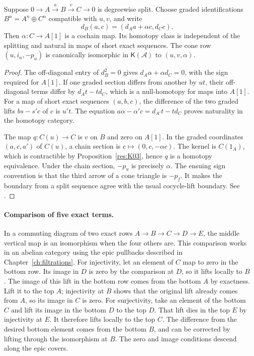 \begin{proposition}\label{res:K04}
Suppose \(0\to A\xrightarrow{u}B\xrightarrow{v}C\to0\) is degreewise
split. Choose graded identifications \(B^n=A^n\oplus C^n\) compatible
with \(u,v\), and write
\[
 d_B(a,c)=(d_A a+\alpha c,d_C c).
\]
Then \(\alpha:C\to A[1]\) is a cochain map. Its homotopy class is
independent of the splitting and natural in maps of short exact sequences.
The cone row \((u,i_u,-p_u)\) is canonically isomorphic in
\(\mathsf K(\mathcal A)\) to \((u,v,\alpha)\).
\end{proposition}
\begin{proof}
The off-diagonal entry of \(d_B^2=0\) gives
\(d_A\alpha+\alpha d_C=0\), with the sign required for \(A[1]\).
If one graded section differs from another by \(u t\), their
off-diagonal terms differ by \(d_A t-t d_C\), which is a
null-homotopy for maps into \(A[1]\). For a map of short exact sequences
\((a,b,c)\), the difference of the two graded lifts \(b s-s'c\) of \(c\)
is \(u' t\). The equation
\(a\alpha-\alpha'c=d_{A'}t-t d_C\) proves naturality in the homotopy
category.

The map \(q:C(u)\to C\) is \(v\) on \(B\) and zero on \(A[1]\).
In the graded coordinates \((a,c,a')\) of \(C(u)\), a chain section
is \(c\mapsto(0,c,-\alpha c)\). The kernel is \(C(1_A)\), which is
contractible by Proposition~\ref{res:K03}, hence \(q\) is a homotopy
equivalence. Under the chain section, \(-p_u\) is precisely \(\alpha\).
The ensuing sign convention is that the third arrow of a cone triangle
is \(-p_f\). It makes the boundary from a split sequence agree with
the usual cocycle-lift boundary. See
\cite[Tags 05SS and 014L]{stacks-derived}.
\end{proof}

\paragraph{Comparison of five exact terms.}
In a commuting diagram of two exact rows \(A\to B\to C\to D\to E\),
the middle vertical map is an isomorphism when the four others
are. This comparison works in an abelian category using the epic
pullbacks described in Chapter~\ref{ch:filtrations}. For injectivity,
let an element of \(C\) map to zero in the bottom row. Its image in
\(D\) is zero by the comparison at \(D\), so it lifts locally to
\(B\). The image of this lift in the bottom row comes from the
bottom \(A\) by exactness. Lift it to the top \(A\); injectivity
at \(B\) shows that the original lift already comes from \(A\),
so its image in \(C\) is zero. For surjectivity, take an element
of the bottom \(C\) and lift its image in the bottom \(D\) to the
top \(D\). That lift dies in the top \(E\) by injectivity at \(E\).
It therefore lifts locally to the top \(C\). The difference from
the desired bottom element comes from the bottom \(B\), and can
be corrected by lifting through the isomorphism at \(B\).
The zero and image conditions descend along the epic covers.

